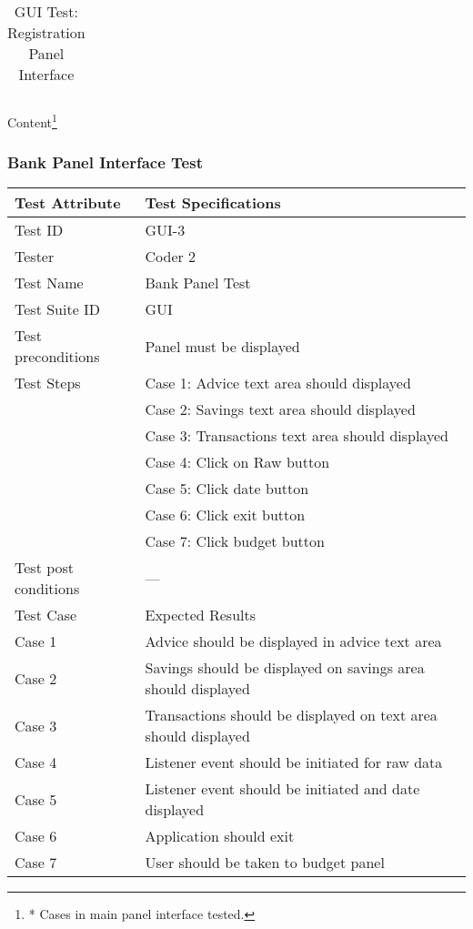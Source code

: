 \documentclass{article}
\begin{document}
\begin{table}[htbp]
\begin{center}
\begin{tabular}{|l | l|}
\end{tabular}
\end{center}

\caption{GUI Test: Registration Panel Interface}
\end{table}
Content\footnote{* Cases in main panel interface tested.}
\label{table:3xxx}

\newpage

\subsubsection{Bank Panel Interface Test}

\begin{table}[htbp]
\begin{center}
\begin{tabular}{|l | l|}
\hline
Test Attribute & Test Specifications \\
\hline
Test ID & GUI-3 \\
\hline
Tester  & Coder 2 \\
\hline

Test Name  & Bank Panel Test \\
\hline
Test Suite  ID& GUI \\

\hline
Test preconditions & Panel must be displayed \\
\hline
Test Steps & Case 1: Advice text area should displayed \\
\hline
  & Case 2: Savings text area should displayed  \\
\hline
  & Case 3: Transactions text area should displayed  \\
\hline
  & Case 4: Click on Raw button  \\
\hline
& Case 5: Click date button  \\
\hline
& Case 6: Click exit button  \\
\hline
& Case 7: Click budget button  \\
\hline

Test post conditions & --- \\
\hline
Test Case & Expected Results\\
\hline
Case 1 &     Advice should be displayed in advice text area  \\
\hline
Case 2 &  Savings should be displayed on savings area should displayed  \\
\hline
Case 3  &  Transactions should be displayed on text area should displayed  \\
\hline
Case 4  &  Listener event should be initiated for raw data  \\
\hline
Case 5 &  Listener event should be initiated and date displayed  \\
\hline
Case 6 &  Application should exit  \\
\hline
Case 7 &  User should be taken to budget panel  \\
\hline


\end{tabular}
\end{center}
\end{table}
\end{document}
